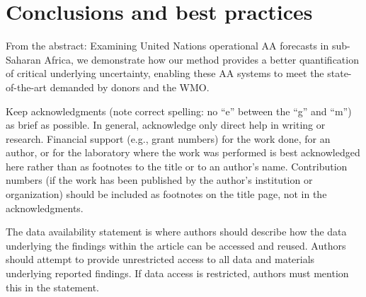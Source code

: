 \documentclass{ametsocV5}
\begin{document}

\section{Conclusions and best practices}

From the abstract:  Examining United Nations operational AA forecasts in sub-Saharan Africa, we demonstrate how our method provides a better quantification of critical underlying uncertainty, enabling these AA systems to meet the state-of-the-art demanded by donors and the WMO.



\acknowledgments
Keep acknowledgments (note correct spelling: no ``e'' between the ``g'' and
``m'') as brief as possible. In general, acknowledge only direct help in
writing or research. Financial support (e.g., grant numbers) for the work
done, for an author, or for the laboratory where the work was performed is
best acknowledged here rather than as footnotes to the title or to an
author's name. Contribution numbers (if the work has been published by the
author's institution or organization) should be included as footnotes on the title page,
not in the acknowledgments.

% 
%
\datastatement
The data availability statement is where authors should describe how the data underlying 
the findings within the article can be accessed and reused. Authors should attempt to 
provide unrestricted access to all data and materials underlying reported findings. 
If data access is restricted, authors must mention this in the statement.

%



\end{document}
